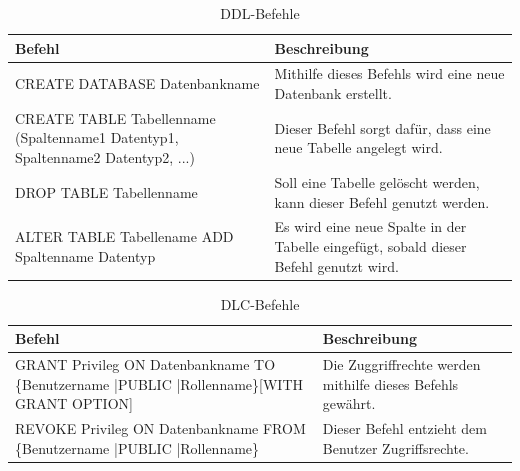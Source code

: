 \begin{table}[h]
	\begin{tabular}{|p{7cm}|p{7cm}|}
		\hline
		\textbf{Befehl} & \textbf{Beschreibung} \\
		\hline
		CREATE DATABASE Datenbankname & Mithilfe dieses Befehls wird eine neue Datenbank erstellt. \\
		\hline
		CREATE TABLE Tabellenname (Spaltenname1 Datentyp1, Spaltenname2 Datentyp2, ...) & Dieser Befehl sorgt dafür, dass eine neue Tabelle angelegt wird.\\
		\hline
		DROP TABLE Tabellenname & Soll eine Tabelle gelöscht werden, kann dieser Befehl genutzt werden.\\
		\hline
		ALTER TABLE Tabellename ADD Spaltenname Datentyp & Es wird eine neue Spalte in der Tabelle eingefügt, sobald dieser Befehl genutzt wird. \\
		\hline
	\end{tabular}
	\caption{DDL-Befehle}
	\label{tab:ddl}
\end{table}


\begin{table}[h]
	\begin{tabular}{|p{7cm}|p{7cm}|}
		\hline
		\textbf{Befehl} & \textbf{Beschreibung} \\
		\hline
		GRANT Privileg  ON Datenbankname TO \{Benutzername |PUBLIC |Rollenname\}[WITH GRANT OPTION] & Die Zuggriffrechte werden mithilfe dieses Befehls gewährt. \\
		\hline
		REVOKE Privileg ON Datenbankname FROM \{Benutzername |PUBLIC |Rollenname\} &  Dieser Befehl entzieht dem Benutzer Zugriffsrechte.\\
		\hline
	\end{tabular}
	\caption{DLC-Befehle}
	\label{tab:dlc}
\end{table}
